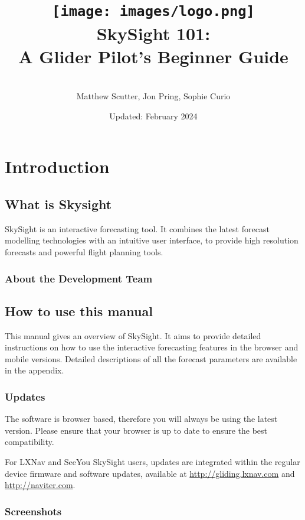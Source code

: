 \documentclass[11pt,a4paper]{article}
\title{\texttt{[image: images/logo.png]}\\[1cm]SkySight 101: \\[0.5cm]A Glider Pilot's Beginner Guide}
\author{\\Matthew Scutter, Jon Pring, Sophie Curio}
\date{Updated: February 2024}
\begin{document}
\begin{titlepage}
\maketitle
\end{titlepage}

\tableofcontents
\pagebreak

\section{Introduction}
\subsection{What is Skysight}

SkySight is an interactive forecasting tool. It combines the latest forecast modelling technologies with an intuitive user interface, to provide high resolution forecasts and powerful flight planning tools.


\subsubsection{About the Development Team}


\subsection{How to use this manual}

This manual gives an overview of SkySight. It aims to provide detailed instructions on how to use the interactive forecasting features in the browser and mobile versions. Detailed descriptions of all the forecast parameters are available in the appendix.



\subsubsection{Updates}

The software is browser based, therefore you will always be using the latest version. Please ensure that your browser is up to date to ensure the best compatibility.

For LXNav and SeeYou SkySight users, updates are integrated within the regular device firmware and software updates, available at \url{http://gliding.lxnav.com} and \url{http://naviter.com}.

\subsubsection{Screenshots}
\end{document}
